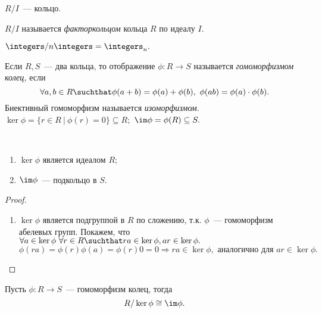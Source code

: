 	\begin{remark}
		$R/I$~--- кольцо.
	\end{remark}
	\begin{definition}
		$R/I$ называется \textit{факторкольцом} кольца $R$ по идеалу $I.$
	\end{definition}
	\begin{exmpl*}
		$\integers/n\integers = \integers_n.$
	\end{exmpl*}
	\begin{definition}
		Если $R, S$~--- два кольца, то отображение ${\phi: R \rightarrow S}$ называется \textit{гомоморфизмом колец,} если
		\begin{equation*}
			\forall a,b \in R\suchthat \phi(a + b) = \phi(a) + \phi(b), \ \phi(ab) = \phi(a) \cdot \phi(b).
		\end{equation*} \n
		Биективный гомоморфизм называется \textit{изоморфизмом}.\n
		${\ker \phi = \{r \in R \ | \ \phi(r) = 0\} \subseteq R;}$ \n
		${\im \phi = \phi(R) \subseteq S.}$
	\end{definition}
	\begin{remark}
		\
		\begin{enumerate}
			\setlength\itemsep{0.25em}
			\item $\ker \phi$ является идеалом $R;$
			\item $\im \phi$~--- подкольцо в $S.$
		\end{enumerate}
	\end{remark}
	\begin{proof}
		\
		\begin{enumerate}
			\setlength\itemsep{0.25em}
			\item $\ker \phi$ является подгруппой в $R$ по сложению, т.к. $\phi$~--- гомоморфизм \n
			абелевых групп. Покажем, что \n ${\forall a \in \ker \phi \ \forall r \in R\suchthat ra \in \ker \phi, ar \in \ker \phi.}$ 
			\begin{equation*}
				\phi(ra) = \phi(r)\phi(a) = \phi(r)0 = 0 \Rightarrow ra \in \ker \phi, \text{ аналогично для } ar \in \ker \phi.
			\end{equation*}
		\end{enumerate}
	\end{proof}
	\newpage
	\begin{theorem*}
		Пусть ${\phi: R \rightarrow S}$~--- гомоморфизм колец, тогда
		\begin{equation*}
			R/\ker \phi \cong \im \phi.
		\end{equation*}
	\end{theorem*}
